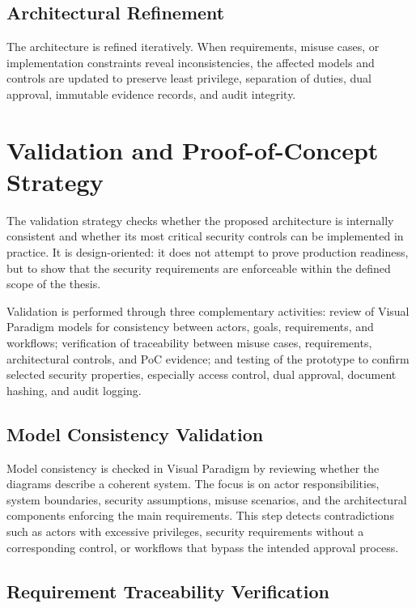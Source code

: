 \documentclass[12pt,a4paper]{report}
\begin{document}
\subsection{Architectural Refinement}

The architecture is refined iteratively. When requirements, misuse cases, or implementation constraints reveal inconsistencies, the affected models and controls are updated to preserve least privilege, separation of duties, dual approval, immutable evidence records, and audit integrity.

\section{Validation and Proof-of-Concept Strategy}

The validation strategy checks whether the proposed architecture is internally consistent and whether its most critical security controls can be implemented in practice. It is design-oriented: it does not attempt to prove production readiness, but to show that the security requirements are enforceable within the defined scope of the thesis.

Validation is performed through three complementary activities: review of Visual Paradigm models for consistency between actors, goals, requirements, and workflows; verification of traceability between misuse cases, requirements, architectural controls, and PoC evidence; and testing of the prototype to confirm selected security properties, especially access control, dual approval, document hashing, and audit logging.

\subsection{Model Consistency Validation}

Model consistency is checked in Visual Paradigm by reviewing whether the diagrams describe a coherent system. The focus is on actor responsibilities, system boundaries, security assumptions, misuse scenarios, and the architectural components enforcing the main requirements. This step detects contradictions such as actors with excessive privileges, security requirements without a corresponding control, or workflows that bypass the intended approval process.

\subsection{Requirement Traceability Verification}
\end{document}
